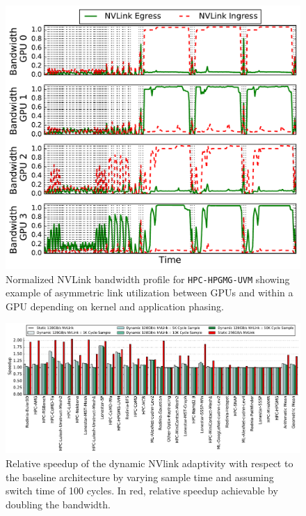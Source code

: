 \begin{figure}[t]
    \centering
    
\includegraphics[width=1.0\columnwidth]{figures/bw_profile_HPGMG_UVM_base.pdf}
    \caption{Normalized NVLink bandwidth profile for \texttt{HPC-HPGMG-UVM} 
showing example of asymmetric 
    link utilization between GPUs and within a GPU depending on kernel and 
application phasing.}
    \label{fig:link-motivation}
\end{figure}

\begin{figure}[tp]
    \centering
    \includegraphics[width=1.0\textwidth]{figures/plot_nvlink_sample_time.pdf}
    \caption{Relative speedup of the dynamic NVlink adaptivity with respect to
	the baseline architecture by varying sample time and assuming switch 
time of
	100 cycles. In red, relative speedup achievable by doubling the 
bandwidth.}
    \label{fig:sampletime}
\end{figure}

